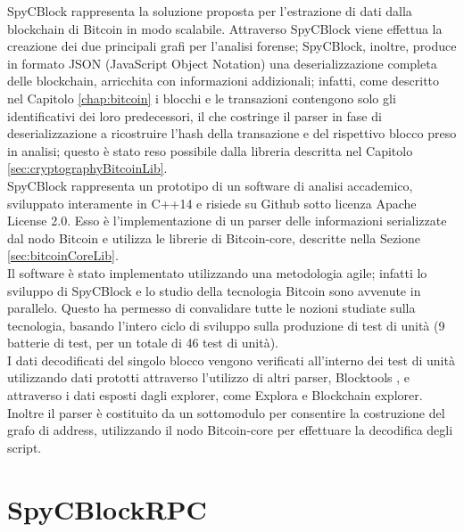 SpyCBlock rappresenta la soluzione proposta per l'estrazione di dati dalla blockchain di Bitcoin in modo scalabile. Attraverso SpyCBlock viene effettua la creazione dei due principali grafi per l'analisi forense; SpyCBlock, inoltre, produce in formato JSON (JavaScript Object Notation) una deserializzazione completa delle blockchain, arricchita con informazioni addizionali; infatti, come descritto nel Capitolo \ref{chap:bitcoin} i blocchi e le transazioni contengono solo gli identificativi dei loro predecessori, il che costringe il parser in fase di deserializzazione a ricostruire l'hash della transazione e del rispettivo blocco preso in analisi; questo è stato reso possibile dalla libreria  descritta nel Capitolo \ref{sec:cryptographyBitcoinLib}.\\
SpyCBlock rappresenta un prototipo di un software di analisi accademico, sviluppato interamente in C++14 e risiede su Github sotto licenza Apache License 2.0. Esso è l'implementazione di un parser delle informazioni serializzate dal nodo Bitcoin e utilizza le librerie di Bitcoin-core, descritte nella Sezione \ref{sec:bitcoinCoreLib}.\\
Il software è stato implementato utilizzando una metodologia agile; infatti lo sviluppo di SpyCBlock e lo studio della tecnologia Bitcoin sono avvenute in parallelo. Questo ha permesso di convalidare tutte le nozioni studiate sulla tecnologia, basando l'intero ciclo di sviluppo sulla produzione di test di unità (9 batterie di test, per un totale di 46 test di unità).\\
I dati decodificati del singolo blocco vengono verificati all'interno dei test di unità utilizzando dati prototti attraverso l'utilizzo di altri parser, Blocktools \cite{parser:blocktools}, e attraverso i dati esposti dagli explorer, come Explora \cite{blockstream:esplora} e Blockchain explorer\cite{blockchain:explorer}.\\
Inoltre il parser è costituito da un sottomodulo per consentire la costruzione del grafo di address, utilizzando il nodo Bitcoin-core per effettuare la decodifica degli script.

\section{SpyCBlockRPC} \label{sec:spycblockrpc}

